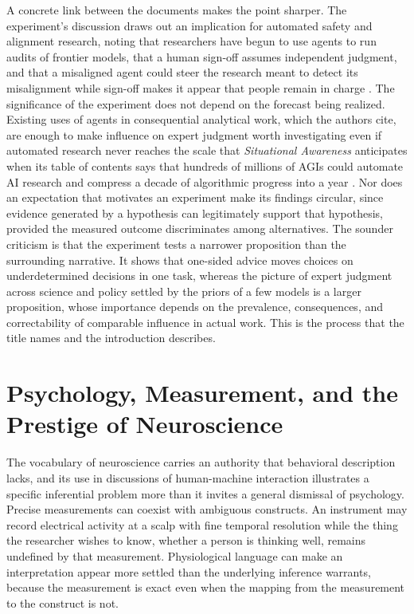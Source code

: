 \documentclass[11pt]{article}
\begin{document}
A concrete link between the documents makes the point sharper. The experiment's discussion draws out an implication for automated safety and alignment research, noting that researchers have begun to use agents to run audits of frontier models, that a human sign-off assumes independent judgment, and that a misaligned agent could steer the research meant to detect its misalignment while sign-off makes it appear that people remain in charge \cite{herdagdelen}. The significance of the experiment does not depend on the forecast being realized. Existing uses of agents in consequential analytical work, which the authors cite, are enough to make influence on expert judgment worth investigating even if automated research never reaches the scale that \emph{Situational Awareness} anticipates when its table of contents says that hundreds of millions of AGIs could automate AI research and compress a decade of algorithmic progress into a year \cite{aschenbrenner}. Nor does an expectation that motivates an experiment make its findings circular, since evidence generated by a hypothesis can legitimately support that hypothesis, provided the measured outcome discriminates among alternatives. The sounder criticism is that the experiment tests a narrower proposition than the surrounding narrative. It shows that one-sided advice moves choices on underdetermined decisions in one task, whereas the picture of expert judgment across science and policy settled by the priors of a few models is a larger proposition, whose importance depends on the prevalence, consequences, and correctability of comparable influence in actual work. This is the process that the title names and the introduction describes.

\section{Psychology, Measurement, and the Prestige of Neuroscience}

The vocabulary of neuroscience carries an authority that behavioral description lacks, and its use in discussions of human-machine interaction illustrates a specific inferential problem more than it invites a general dismissal of psychology. Precise measurements can coexist with ambiguous constructs. An instrument may record electrical activity at a scalp with fine temporal resolution while the thing the researcher wishes to know, whether a person is thinking well, remains undefined by that measurement. Physiological language can make an interpretation appear more settled than the underlying inference warrants, because the measurement is exact even when the mapping from the measurement to the construct is not.
\end{document}
